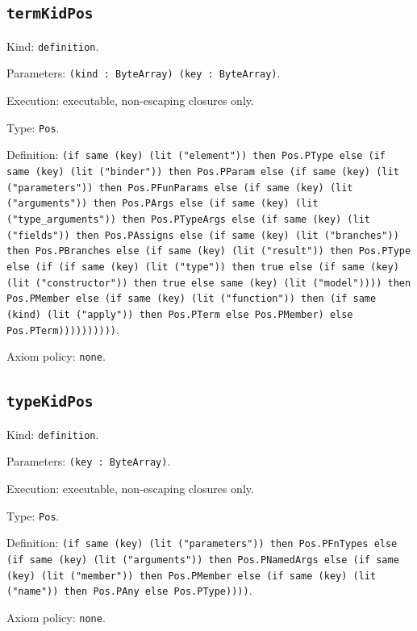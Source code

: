 \documentclass[11pt]{article}
\begin{document}
\subsection*{\texttt{termKidPos}}
\noindent Kind: \texttt{definition}.\par
\noindent Parameters: \texttt{(kind : ByteArray) (key : ByteArray)}.\par
\noindent Execution: executable, non-escaping closures only.\par
\noindent Type: \texttt{Pos}.\par
\noindent Definition: \texttt{(if same (key) (lit ("element")) then Pos.PType else (if same (key) (lit ("binder")) then Pos.PParam else (if same (key) (lit ("parameters")) then Pos.PFunParams else (if same (key) (lit ("arguments")) then Pos.PArgs else (if same (key) (lit ("type\_arguments")) then Pos.PTypeArgs else (if same (key) (lit ("fields")) then Pos.PAssigns else (if same (key) (lit ("branches")) then Pos.PBranches else (if same (key) (lit ("result")) then Pos.PType else (if (if same (key) (lit ("type")) then true else (if same (key) (lit ("constructor")) then true else same (key) (lit ("model")))) then Pos.PMember else (if same (key) (lit ("function")) then (if same (kind) (lit ("apply")) then Pos.PTerm else Pos.PMember) else Pos.PTerm))))))))))}.\par
\noindent Axiom policy: \texttt{none}.\par
\subsection*{\texttt{typeKidPos}}
\noindent Kind: \texttt{definition}.\par
\noindent Parameters: \texttt{(key : ByteArray)}.\par
\noindent Execution: executable, non-escaping closures only.\par
\noindent Type: \texttt{Pos}.\par
\noindent Definition: \texttt{(if same (key) (lit ("parameters")) then Pos.PFnTypes else (if same (key) (lit ("arguments")) then Pos.PNamedArgs else (if same (key) (lit ("member")) then Pos.PMember else (if same (key) (lit ("name")) then Pos.PAny else Pos.PType))))}.\par
\noindent Axiom policy: \texttt{none}.\par
\end{document}
